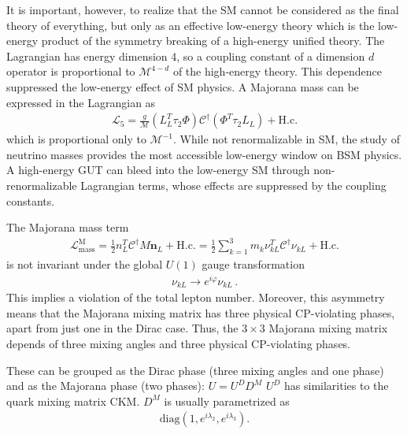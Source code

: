 \documentclass[twocolumn]{article}
\newcommand{\n}[1]{\ensuremath{\nu_{#1}}}
\begin{document}
It is important, however, to realize that the SM cannot be considered as
the final theory of everything, but only as an effective low-energy theory which is
the low-energy product of the symmetry breaking of a high-energy unified theory. The Lagrangian has energy dimension 4, so a coupling constant of a dimension $d$ operator is proportional to $\mathcal{M}^{4-d}$ of the high-energy theory. This dependence suppressed the low-energy effect of SM physics. A Majorana mass can be expressed in the Lagrangian as 
\begin{align*}
  \mathcal{L}_{5}=\frac{g}{\mathcal{M}}\left(L_{L}^{T} \tau_{2} \Phi\right) \mathcal{C}^{\dagger}\left(\Phi^{T} \tau_{2} L_{L}\right)+\mathrm{H.c.}
\end{align*}
which is proportional only to $\mathcal{M}^{-1}$. While not renormalizable in SM, the study of neutrino masses provides the most accessible low-energy window on BSM physics. A high-energy GUT can bleed into the low-energy SM through non-renormalizable Lagrangian terms, whose effects are suppressed by the coupling constants.

The Majorana mass term 
\begin{align*}
  \mathcal{L}_{\mathrm{mass}}^{\mathrm{M}}=\frac{1}{2} n_{L}^{T} \mathcal{C}^{\dagger} M \boldsymbol{n}_{L}+\mathrm{H.c.}=\frac{1}{2} \sum_{k=1}^{3} m_{k} \nu_{kL}^{T} \mathcal{C}^{\dagger} \n{k L}+\mathrm{H.c.}
\end{align*}
is not invariant under the global $U(1)$ gauge transformation
\begin{align*}
  \n{k L} \to e^{i \varphi} \n{k L}\,.
\end{align*}
This implies a violation of the total lepton number. Moreover, this asymmetry means that the Majorana mixing matrix has three physical CP-violating phases, apart from just one in the Dirac case. Thus, the $3 \times 3$ Majorana mixing matrix depends of three mixing angles and three physical CP-violating phases. 

These can be grouped as the Dirac phase (three mixing angles and one phase) and as the Majorana phase (two phases):
$U=U^D D^M$
$U^D$ has similarities to the quark mixing matrix CKM. $D^M$ is usually parametrized as 
\begin{align*}
  \text{diag}(1, e^{i \lambda_2},e^{i \lambda_3})
.\end{align*} 
\end{document}
